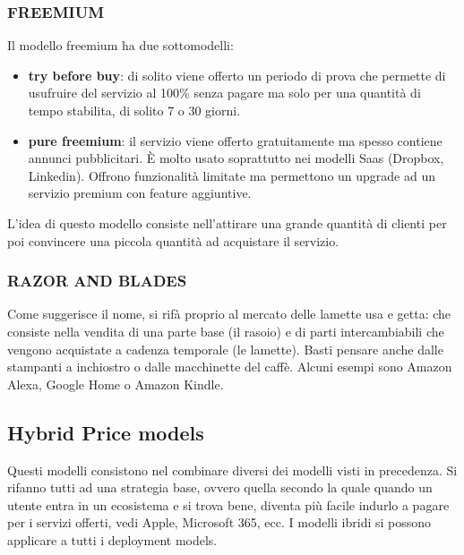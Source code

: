 \subsubsection{FREEMIUM}
Il modello freemium ha due sottomodelli:
\begin{itemize}
    \item \textbf{try before buy}: di solito viene offerto un periodo di prova che permette di usufruire del servizio al 100\% senza pagare ma solo per una quantità di tempo stabilita, di solito 7 o 30 giorni.
    \item \textbf{pure freemium}: il servizio viene offerto gratuitamente ma spesso contiene annunci pubblicitari. È molto usato soprattutto nei modelli Saas (Dropbox, Linkedin). Offrono funzionalità limitate ma permettono un upgrade ad un servizio premium con feature aggiuntive.
\end{itemize}
L'idea di questo modello consiste nell'attirare una grande quantità di clienti per poi convincere una piccola quantità ad acquistare il servizio.

\subsubsection{RAZOR AND BLADES}
Come suggerisce il nome, si rifà proprio al mercato delle lamette usa e getta: che consiste nella vendita di una parte base (il rasoio) e di parti intercambiabili che vengono acquistate a cadenza temporale (le lamette). Basti pensare anche dalle stampanti a inchiostro o dalle macchinette del caffè. Alcuni esempi sono Amazon Alexa, Google Home o Amazon Kindle.

\subsection{Hybrid Price models}
Questi modelli consistono nel combinare diversi dei modelli visti in precedenza. Si rifanno tutti ad una strategia base, ovvero quella secondo la quale quando un utente entra in un ecosistema e si trova bene, diventa più facile indurlo a pagare per i servizi offerti, vedi Apple, Microsoft 365, ecc. I modelli ibridi si possono applicare a tutti i deployment models.


